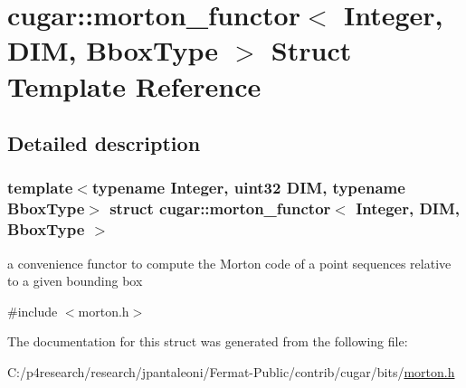 \hypertarget{structcugar_1_1morton__functor}{}\section{cugar\+:\+:morton\+\_\+functor$<$ Integer, D\+IM, Bbox\+Type $>$ Struct Template Reference}
\label{structcugar_1_1morton__functor}


\subsection{Detailed description}
\subsubsection*{template$<$typename Integer, uint32 D\+IM, typename Bbox\+Type$>$\newline
struct cugar\+::morton\+\_\+functor$<$ Integer, D\+I\+M, Bbox\+Type $>$}

a convenience functor to compute the Morton code of a point sequences relative to a given bounding box 

{\ttfamily \#include $<$morton.\+h$>$}



The documentation for this struct was generated from the following file\+:\begin{DoxyCompactItemize}
\item 
C\+:/p4research/research/jpantaleoni/\+Fermat-\/\+Public/contrib/cugar/bits/\hyperlink{morton_8h}{morton.\+h}\end{DoxyCompactItemize}

